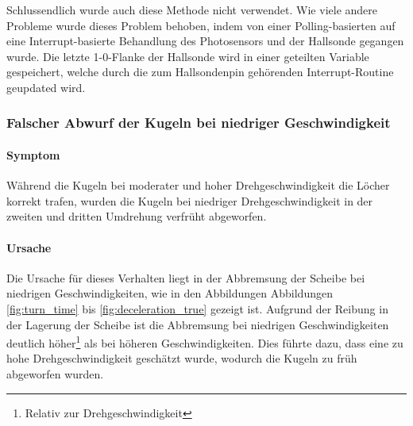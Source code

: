 \documentclass{kis}
\begin{document}
Schlussendlich wurde auch diese Methode nicht verwendet. Wie viele andere Probleme wurde dieses Problem behoben, indem von einer Polling-basierten auf eine Interrupt-basierte Behandlung des Photosensors und der Hallsonde gegangen wurde. Die letzte 1-0-Flanke der Hallsonde wird in einer geteilten Variable gespeichert, welche durch die zum Hallsondenpin gehörenden Interrupt-Routine geupdated wird.

\subsubsection{Falscher Abwurf der Kugeln bei niedriger Geschwindigkeit}
\paragraph{Symptom}
Während die Kugeln bei moderater und hoher Drehgeschwindigkeit die Löcher korrekt trafen, wurden die Kugeln bei niedriger Drehgeschwindigkeit in der zweiten und dritten Umdrehung verfrüht abgeworfen.

\paragraph{Ursache}
Die Ursache für dieses Verhalten liegt in der Abbremsung der Scheibe bei niedrigen Geschwindigkeiten, wie in den Abbildungen Abbildungen \ref{fig:turn_time} bis \ref{fig:deceleration_true} gezeigt ist. Aufgrund der Reibung in der Lagerung der Scheibe ist die Abbremsung bei niedrigen Geschwindigkeiten deutlich höher\footnote{Relativ zur Drehgeschwindigkeit} als bei höheren Geschwindigkeiten. Dies führte dazu, dass eine zu hohe Drehgeschwindigkeit geschätzt wurde, wodurch die Kugeln zu früh abgeworfen wurden.
\end{document}
